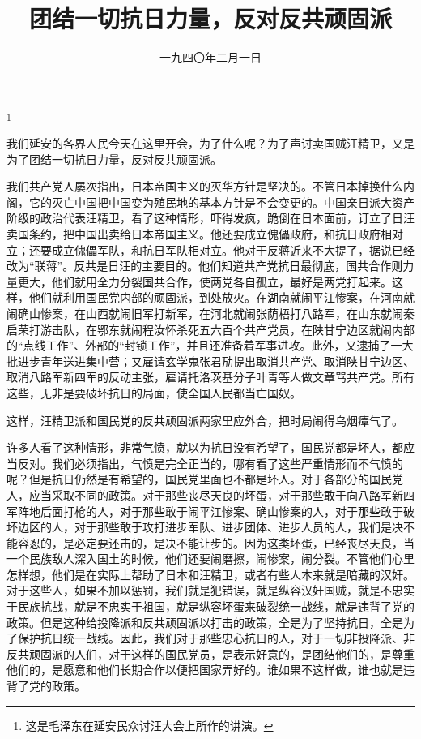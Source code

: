
\title{团结一切抗日力量，反对反共顽固派}
\date{一九四〇年二月一日}
\thanks{这是毛泽东在延安民众讨汪大会上所作的讲演。}
\maketitle


我们延安的各界人民今天在这里开会，为了什么呢？为了声讨卖国贼汪精卫，又是为了团结一切抗日力量，反对反共顽固派。

我们共产党人屡次指出，日本帝国主义的灭华方针是坚决的。不管日本掉换什么内阁，它的灭亡中国把中国变为殖民地的基本方针是不会变更的。中国亲日派大资产阶级的政治代表汪精卫，看了这种情形，吓得发疯，跪倒在日本面前，订立了日汪卖国条约，把中国出卖给日本帝国主义。他还要成立傀儡政府，和抗日政府相对立；还要成立傀儡军队，和抗日军队相对立。他对于反蒋近来不大提了，据说已经改为“联蒋”。反共是日汪的主要目的。他们知道共产党抗日最彻底，国共合作则力量更大，他们就用全力分裂国共合作，使两党各自孤立，最好是两党打起来。这样，他们就利用国民党内部的顽固派，到处放火。在湖南就闹平江惨案，在河南就闹确山惨案，在山西就闹旧军打新军，在河北就闹张荫梧打八路军，在山东就闹秦启荣打游击队，在鄂东就闹程汝怀杀死五六百个共产党员，在陕甘宁边区就闹内部的“点线工作”、外部的“封锁工作”，并且还准备着军事进攻。此外，又逮捕了一大批进步青年送进集中营；又雇请玄学鬼张君劢提出取消共产党、取消陕甘宁边区、取消八路军新四军的反动主张，雇请托洛茨基分子叶青等人做文章骂共产党。所有这些，无非是要破坏抗日的局面，使全国人民都当亡国奴。

这样，汪精卫派和国民党的反共顽固派两家里应外合，把时局闹得乌烟瘴气了。

许多人看了这种情形，非常气愤，就以为抗日没有希望了，国民党都是坏人，都应当反对。我们必须指出，气愤是完全正当的，哪有看了这些严重情形而不气愤的呢？但是抗日仍然是有希望的，国民党里面也不都是坏人。对于各部分的国民党人，应当采取不同的政策。对于那些丧尽天良的坏蛋，对于那些敢于向八路军新四军阵地后面打枪的人，对于那些敢于闹平江惨案、确山惨案的人，对于那些敢于破坏边区的人，对于那些敢于攻打进步军队、进步团体、进步人员的人，我们是决不能容忍的，是必定要还击的，是决不能让步的。因为这类坏蛋，已经丧尽天良，当一个民族敌人深入国土的时候，他们还要闹磨擦，闹惨案，闹分裂。不管他们心里怎样想，他们是在实际上帮助了日本和汪精卫，或者有些人本来就是暗藏的汉奸。对于这些人，如果不加以惩罚，我们就是犯错误，就是纵容汉奸国贼，就是不忠实于民族抗战，就是不忠实于祖国，就是纵容坏蛋来破裂统一战线，就是违背了党的政策。但是这种给投降派和反共顽固派以打击的政策，全是为了坚持抗日，全是为了保护抗日统一战线。因此，我们对于那些忠心抗日的人，对于一切非投降派、非反共顽固派的人们，对于这样的国民党员，是表示好意的，是团结他们的，是尊重他们的，是愿意和他们长期合作以便把国家弄好的。谁如果不这样做，谁也就是违背了党的政策。

